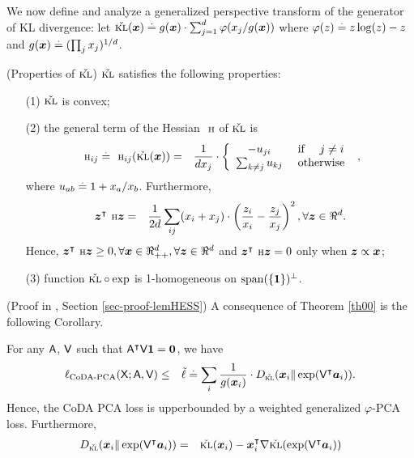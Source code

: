 \documentclass{article}
\begin{document}
We now define and analyze a generalized perspective transform of the
generator of KL divergence: let $\check{{\textsc{kl}}}(\bm{x}) \stackrel{\mathrm{.}}{=} g(\bm{x}) \cdot \sum_{j=1}^d \varphi(x_j /
g(\bm{x}))$ where $\varphi(z) \stackrel{\mathrm{.}}{=} z\log(z) - z$ and
$g(\bm{x})\stackrel{\mathrm{.}}{=} (\prod_j x_j)^{1/d}$.
\begin{lemma}\label{lemHESS}(Properties of $\check{{\textsc{kl}}}$)
$\check{{\textsc{kl}}}$ satisfies the following properties:
\begin{itemize}
\item [(1)] $\check{{\textsc{kl}}}$ is convex;
\item [(2)] the general term of the
Hessian $\hessian$ of $\check{{\textsc{kl}}}$ is
\begin{eqnarray}
\hessian_{ij} \defeq \hessian_{ij}(\check{\kl}(\ve{x})) & = &
\frac{1}{dx_j} \cdot \left\{
\begin{array}{ccl}
-u_{ji} & \mbox{ if } & j\neq i\\
\sum_{k\neq j} u_{kj} & \multicolumn{2}{c}{\mbox{ otherwise }}
\end{array}
\right. ,
\end{eqnarray}
where $u_{ab} \stackrel{\mathrm{.}}{=} 1+ x_a/x_b$. Furthermore,
\begin{eqnarray}
\ve{z}^\top \hessian \ve{z} & = & \frac{1}{2d}\sum_{ij}(x_i+x_j)\cdot \left(\frac{z_i}{x_i}-\frac{z_j}{x_j}\right)^2, \forall \ve{z}\in \Re^d.
\end{eqnarray}
Hence, $\ve{z}^\top \hessian \ve{z} \geq 0, \forall \ve{x} \in
\Re_{++}^d, \forall \ve{z} \in
\Re^d$ and $\ve{z}^\top \hessian \ve{z} = 0$ only when
$\bm{z} \propto \bm{x}$;
\item [(3)] function $\check{{\textsc{kl}}} \circ \exp$ is 1-homogeneous on
  $\mathrm{span}(\{\bm{1}\})^\bot$.
\end{itemize}
\end{lemma}
(Proof in \SM, Section \ref{sec-proof-lemHESS})
A consequence of Theorem \ref{th00} is the following Corollary.
\begin{corollary}\label{corCoDA}
For any $\mathsf{A}$, $\mathsf{V}$ such that $\mathsf{A}^\intercal \mathsf{V} \bm{1} = \bm{0}$, we have
\begin{eqnarray}
 \ell_{\mathrm{CoDA\text{-}PCA}}(\mathsf{X}; \mathsf{A}, \mathsf{V})  & \leq &
 \tilde{\ell} \stackrel{\mathrm{.}}{=} \sum_i \frac{1}{g(\bm{x}_i)} \cdot D_{\check{{\textsc{kl}}}} (\bm{x}_i \|
\exp(\mathsf{V}^\intercal \bm{a}_i)).\label{eqBOUND1}
\end{eqnarray}
Hence, the CoDA PCA loss is upperbounded by a weighted generalized
$\varphi$-PCA loss. Furthermore,
\begin{eqnarray}
D_{\check{{\textsc{kl}}}} (\bm{x}_i \|
\exp(\mathsf{V}^\intercal \bm{a}_i)) & = & \check{{\textsc{kl}}}(\bm{x}_i) - \bm{x}_i^\intercal \nabla \check{{\textsc{kl}}}(\exp(\mathsf{V}^\intercal
   \bm{a}_i))\label{eqBOUND2}
\end{eqnarray}
\end{corollary}
\end{document}
